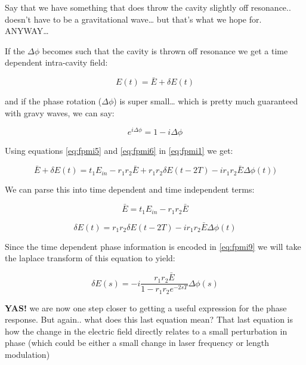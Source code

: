 \noindent Say that we have something that does throw the cavity slightly off
resonance.. doesn't have to be a gravitational wave\ldots{} but that's
what we hope for. ANYWAY\ldots{}

\noindent If the \(\Delta \phi\) becomes such that the cavity is thrown off
resonance we get a time dependent intra-cavity field:

\begin{equation} \label{eq:fpmi5} E(t) = \bar{E} + \delta E(t) \end{equation}

and if the phase rotation (\(\Delta \phi\)) is super small\ldots{} which
is pretty much guaranteed with gravy waves, we can say:

\begin{equation} \label{eq:fpmi6} e^{i\Delta \phi} = 1- i \Delta \phi \end{equation}

\noindent Using equations \ref{eq:fpmi5} and \ref{eq:fpmi6} in \ref{eq:fpmi1} we get:

\begin{equation} \bar{E} + \delta E(t) = t_1 E_{in} -r_1r_2\bar{E} + r_1r_2 \delta E(t-2T) - ir_1r_2\bar{E}\Delta \phi(t)) \end{equation}

\noindent We can parse this into time dependent and time independent terms:

\begin{equation} \bar{E} = t_1 E_{in} -r_1r_2\bar{E} \end{equation}

\begin{equation} \label{eq:fpmi9} \delta E(t) = r_1r_2 \delta E(t-2T) - ir_1r_2\bar{E}\Delta \phi(t) \end{equation}

\noindent Since the time dependent phase information is encoded in \ref{eq:fpmi9} we
will take the laplace transform of this equation to yield:

\begin{equation}\delta E(s) = -i \frac{r_1r_2 \bar{E}}{1-r_1r_2e^{-2sT}} \Delta \phi(s)\end{equation}

\textbf{YAS!} we are now one step closer to getting a useful expression
for the phase response. But again.. what does this last equation mean?
That last equation is how the change in the electric field directly
relates to a small perturbation in phase (which could be either a small
change in laser frequency or length modulation)

